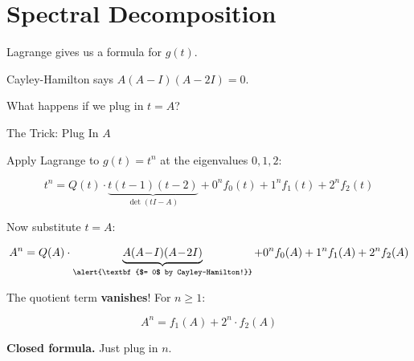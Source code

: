 \documentclass[10pt]{beamer}
\theoremstyle{definition}
\newcommand{\x}[1]{\alert{\textbf{#1}}}
\begin{document}
\section{Spectral Decomposition}


\begin{frame}{}

\vfill

\begin{center}
{\Large Lagrange gives us a formula for $g(t)$.}

\vspace{0.8cm}

{\Large Cayley-Hamilton says $A(A-I)(A-2I) = 0$.}

\vspace{0.8cm}

{\Large What happens if we plug in $t = A$?}
\end{center}

\vfill

\end{frame}


%
\begin{frame}{The Trick: Plug In $A$}

Apply Lagrange to $g(t) = t^n$ at the eigenvalues $0, 1, 2$:

$$t^n = Q(t) \cdot \underbrace{t(t\!-\!1)(t\!-\!2)}_{\det(tI-A)} + 0^n f_0(t) + 1^n f_1(t) + 2^n f_2(t)$$

\vfill\pause

Now substitute $t = A$:

$$A^n = Q(A) \cdot \underbrace{A(A\!-\!I)(A\!-\!2I)}_{\x{$= 0$ by Cayley--Hamilton!}} + 0^n f_0(A) + 1^n f_1(A) + 2^n f_2(A)$$

\vfill\pause

The quotient term \x{vanishes}! \; For $n \geq 1$:

$$\boxed{A^n = f_1(A) + 2^n \cdot f_2(A)}$$

\vfill

\x{Closed formula.} Just plug in $n$.

\end{frame}
\end{document}
